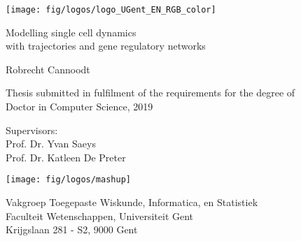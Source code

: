 
\newcommand{\orcid}[1]{	\texttt{[image: fig/icons/orcid.png]}\;\href{https://orcid.org/#1}{{https://orcid.org/}{\color{black}#1}}}
\newcommand{\github}[1]{	\texttt{[image: fig/icons/github.png]}\;\href{https://github.com/#1}{{https://github.com/}{\color{black}#1}}}

\begin{titlepage}
	
	\texttt{[image: fig/logos/logo\_UGent\_EN\_RGB\_color]}
	
	\centering
	
	\vfill
	{\Huge \textsf{Modelling single cell dynamics\\with trajectories and gene regulatory networks}}
	
	\vspace{2.25cm}
	
	{\LARGE \textsf{Robrecht Cannoodt}} %
	
	\vspace{2.25cm}
	
	{\textsf{Thesis submitted in fulfilment of the requirements for the degree of \\Doctor in Computer Science, 2019}}
	
	\vfill
	
	{\textsf{Supervisors: \\
			Prof. Dr. Yvan Saeys\\Prof. Dr. Katleen De Preter}}
	
	\vfill
	
	\texttt{[image: fig/logos/mashup]}
	\vspace{1cm}
	
	{\textsf{Vakgroep Toegepaste Wiskunde, Informatica, en Statistiek\\
			Faculteit Wetenschappen, Universiteit Gent \\
			Krijgslaan 281 - S2, 9000 Gent}}
		
\end{titlepage}


